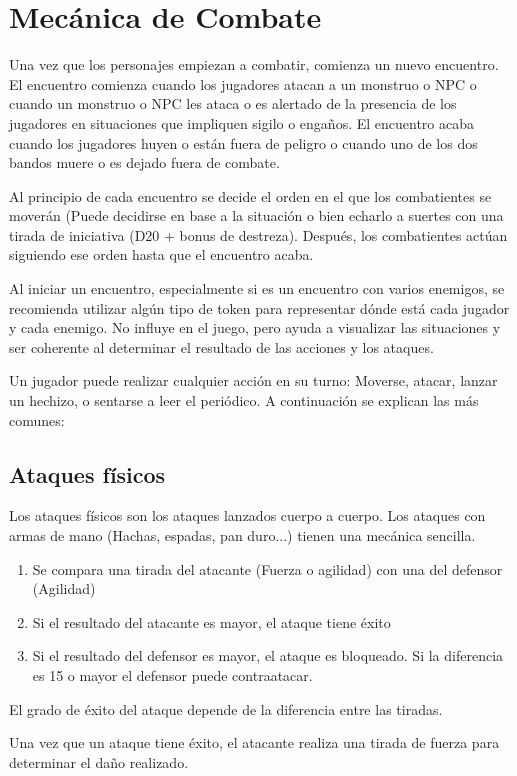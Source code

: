 \section{Mecánica de Combate}

Una vez que los personajes empiezan a combatir, comienza un nuevo encuentro. El encuentro comienza cuando los jugadores atacan a un monstruo o NPC o cuando un monstruo o NPC les ataca o es alertado de la presencia de los jugadores en situaciones que impliquen sigilo o engaños. El encuentro acaba cuando los jugadores huyen o están fuera de peligro o cuando uno de los dos bandos muere o es dejado fuera de combate. 

Al principio de cada encuentro se decide el orden en el que los combatientes se moverán (Puede decidirse en base a la situación o bien echarlo a suertes con una tirada de iniciativa (D20 + bonus de destreza). Después, los combatientes actúan siguiendo ese orden hasta que el encuentro acaba.

Al iniciar un encuentro, especialmente si es un encuentro con varios enemigos, se recomienda utilizar algún tipo de token para representar dónde está cada jugador y cada enemigo. No influye en el juego, pero ayuda a visualizar las situaciones y ser coherente al determinar el resultado de las acciones y los ataques.

Un jugador puede realizar cualquier acción en su turno: Moverse, atacar, lanzar un hechizo, o sentarse a leer el periódico. A continuación se explican las más comunes:

\subsection{Ataques físicos}

Los ataques físicos son los ataques lanzados cuerpo a cuerpo. Los ataques con armas de mano (Hachas, espadas, pan duro...) tienen una mecánica sencilla. 

\begin{enumerate}
\item Se compara una tirada del atacante (Fuerza o agilidad) con una del defensor (Agilidad)
\item Si el resultado del atacante es mayor, el ataque tiene éxito
\item Si el resultado del defensor es mayor, el ataque es bloqueado. Si la diferencia es 15 o mayor el defensor puede contraatacar.
\end{enumerate}

\par 
El grado de éxito del ataque depende de la diferencia entre las tiradas. 
\par 
Una vez que un ataque tiene éxito, el atacante realiza una tirada de fuerza para determinar el daño realizado. 

